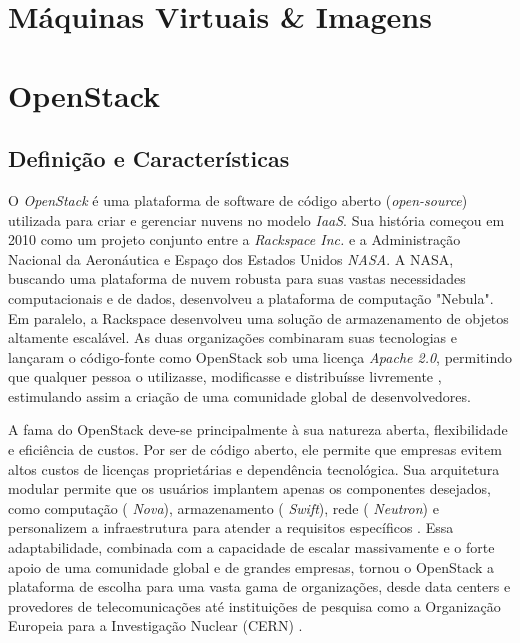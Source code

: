 \section{Máquinas Virtuais \& Imagens}

\section{OpenStack}

\subsection{Definição e Características}

O  \textit{OpenStack} é uma plataforma de software de código aberto (\textit{open-source}) utilizada para criar e gerenciar nuvens no modelo \textit{IaaS}. Sua história começou em 2010 como um projeto conjunto entre a  \textit{Rackspace Inc.} e a Administração Nacional da Aeronáutica e Espaço dos Estados Unidos \textit{NASA}. A NASA, buscando uma plataforma de nuvem robusta para suas vastas necessidades computacionais e de dados, desenvolveu a plataforma de computação "Nebula". Em paralelo, a Rackspace desenvolveu uma solução de armazenamento de objetos altamente escalável. As duas organizações combinaram suas tecnologias e lançaram o código-fonte como OpenStack sob uma licença  \textit{Apache 2.0}, permitindo que qualquer pessoa o utilizasse, modificasse e distribuísse livremente \cite{nasa2012}, estimulando assim a criação de uma comunidade global de desenvolvedores.

A fama do OpenStack deve-se principalmente à sua natureza aberta, flexibilidade e eficiência de custos. Por ser de código aberto, ele permite que empresas evitem altos custos de licenças proprietárias e dependência tecnológica. Sua arquitetura modular permite que os usuários implantem apenas os componentes desejados, como computação ( \textit{Nova}), armazenamento ( \textit{Swift}), rede ( \textit{Neutron}) e personalizem a infraestrutura para atender a requisitos específicos \cite{grzonka2015}. Essa adaptabilidade, combinada com a capacidade de escalar massivamente e o forte apoio de uma comunidade global e de grandes empresas, tornou o OpenStack a plataforma de escolha para uma vasta gama de organizações, desde data centers e provedores de telecomunicações até instituições de pesquisa como a Organização Europeia para a Investigação Nuclear (CERN) \cite{rousseau2019}.

